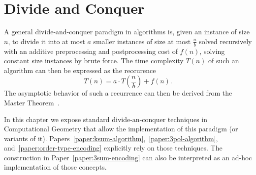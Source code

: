 \chapter{\done Divide and Conquer}

A general divide-and-conquer paradigm in algorithms is, given an instance of
size \(n\), to divide it into at most
\(a\) smaller instances of size at most \(\frac{n}{b}\) solved recursively
with an additive preprocessing and postprocessing cost of \(f(n)\), solving
constant size instances by brute force.
%
The time complexity \(T(n)\) of such an algorithm can then be expressed as the
reccurence
\begin{displaymath}
	T(n) = a \cdot T\left(\frac nb\right) + f(n).
\end{displaymath}
%
The asymptotic behavior of such a recurrence can then be derived from the
Master Theorem~\cite{BHS80,CLRS09}.

In this chapter we expose standard divide-an-conquer techniques in
Computational Geometry that allow the implementation of this paradigm (or
variants of it).
%
Papers~\ref{paper:ksum-algorithm},~\ref{paper:3pol-algorithm},
and~\ref{paper:order-type-encoding} explicitly rely on those techniques.
%
The construction in
Paper~\ref{paper:3sum-encoding} can also be interpreted as an ad-hoc
implementation of those concepts.






